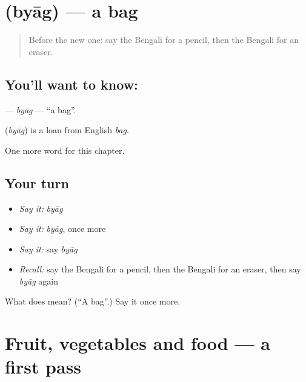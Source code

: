 \section[\texorpdfstring{\bn{ব্যাগ} (byāg)}{ব্যাগ (byāg)}]{ (byāg) — a bag}

\label{lesson:BN-C129-byag}



\begin{quote}
Before the new one: say the Bengali for a pencil, then the Bengali for an eraser.
\end{quote}

\subsection*{You'll want to know: }
\textbf{} — \emph{byāg} — \textquotedblleft{}a bag\textquotedblright{}.

\begin{cousinweb}
\textbf{} (\emph{byāg}) is a loan from English \emph{bag}.
\end{cousinweb}

\begin{grammarlens}[title={What you've built}]
One more word for this chapter.
\end{grammarlens}

\subsection*{Your turn}
\begin{itemize}
\raggedright
  \item \emph{Say it:} \emph{byāg}
  \item \emph{Say it:} \emph{byāg}, once more
  \item \emph{Say it:} say \emph{byāg}
  \item \emph{Recall:} say the Bengali for a pencil, then the Bengali for an eraser, then say \emph{byāg} again
\end{itemize}

\begin{tcolorbox}[breakable,colback=teal!4,colframe=teal!35!black,title={Before you move on}]
What does  mean? (\textquotedblleft{}A bag\textquotedblright{}.) Say it once more.
\end{tcolorbox}
\section[(dialogue)]{Fruit, vegetables and food — a first pass}

